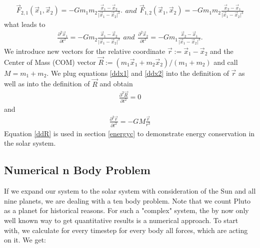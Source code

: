 \documentclass[a4paper]{article}
\begin{document}
\begin{subequations}
\begin{align}
\vec{F}_{2,1} (\vec{x}_1, \vec{x}_2) = - Gm_1m_2 \frac{\vec{x}_1-\vec{x}_2}{\lvert \vec{x}_1 - \vec{x}_2 \lvert ^3}.
\end{align}
and
\begin{align}
\vec{F}_{1,2} (\vec{x}_1, \vec{x}_2) = - Gm_1m_2 \frac{\vec{x}_2-\vec{x}_1}{\lvert \vec{x}_1 - \vec{x}_2 \lvert ^3}
\end{align}
\end{subequations}
what leads to
\begin{subequations}
\begin{align}\label{ddx1}
\frac{\partial^2\vec{x}_1}{\partial t^2}  = - Gm_2 \frac{\vec{x}_1-\vec{x}_2}{\lvert \vec{x}_1 - \vec{x}_2 \lvert ^3} 
\end{align}
and
\begin{align}\label{ddx2}
\frac{\partial^2\vec{x}_2}{\partial t^2}  = - Gm_1 \frac{\vec{x}_2-\vec{x}_1}{\lvert \vec{x}_1 - \vec{x}_2 \lvert ^3}. 
\end{align}
\end{subequations}
We introduce new vectors for the relative coordinate $\vec{r} := \vec{x}_1 - \vec{x}_2$ and the Center of Mass (COM) vector $\vec{R} := (m_1 \vec{x}_1 + m_2 \vec{x}_2)/(m_1 + m_2)$ and call $M=m_1 + m_2$. We plug equations \ref{ddx1} and \ref{ddx2} into the definition of $\vec{r}$ as well as into the definition of $\vec{R}$ and obtain
\begin{align}\label{ddR}
\frac{\partial^2 \vec{R}}{\partial t^2} =0
\end{align}
and
\begin{align}
\frac{\partial^2 \vec{r}}{\partial t^2} = -GM \frac{\vec{r}}{r^3}
\end{align}
Equation \ref{ddR} is used in section \ref{energyc} to demonstrate energy conservation in the solar system.

\subsection{Numerical n Body Problem}
If we expand our system to the solar system with consideration of the Sun and all nine planets, we are dealing with a ten body problem. Note that we count Pluto as a planet for historical reasons. For such a "complex" system, the by now only well known way to get quantitative results is a numerical approach.
To start with, we calculate for every timestep for every body all forces, which are acting on it. We get:
\end{document}
